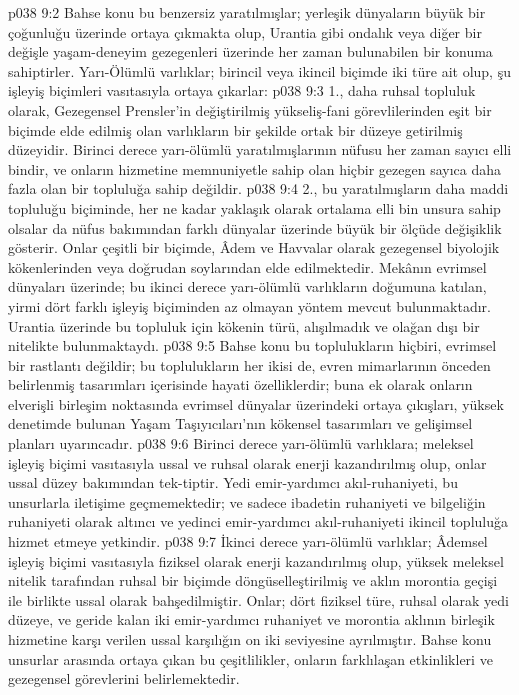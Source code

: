 \vs p038 9:2 Bahse konu bu benzersiz yaratılmışlar; yerleşik dünyaların büyük bir çoğunluğu üzerinde ortaya çıkmakta olup, Urantia gibi ondalık veya diğer bir değişle yaşam\hyp{}deneyim gezegenleri üzerinde her zaman bulunabilen bir konuma sahiptirler. Yarı\hyp{}Ölümlü varlıklar; birincil veya ikincil biçimde iki türe ait olup, şu işleyiş biçimleri vasıtasıyla ortaya çıkarlar:
\vs p038 9:3 1.\bibnobreakspace {}, daha ruhsal topluluk olarak, Gezegensel Prensler’in değiştirilmiş yükseliş\hyp{}fani görevlilerinden eşit bir biçimde elde edilmiş olan varlıkların bir şekilde ortak bir düzeye getirilmiş düzeyidir. Birinci derece yarı\hyp{}ölümlü yaratılmışlarının nüfusu her zaman sayıcı elli bindir, ve onların hizmetine memnuniyetle sahip olan hiçbir gezegen sayıca daha fazla olan bir topluluğa sahip değildir.
\vs p038 9:4 2.\bibnobreakspace {}, bu yaratılmışların daha maddi topluluğu biçiminde, her ne kadar yaklaşık olarak ortalama elli bin unsura sahip olsalar da nüfus bakımından farklı dünyalar üzerinde büyük bir ölçüde değişiklik gösterir. Onlar çeşitli bir biçimde, Âdem ve Havvalar olarak gezegensel biyolojik kökenlerinden veya doğrudan soylarından elde edilmektedir. Mekânın evrimsel dünyaları üzerinde; bu ikinci derece yarı\hyp{}ölümlü varlıkların doğumuna katılan, yirmi dört farklı işleyiş biçiminden az olmayan yöntem mevcut bulunmaktadır. Urantia üzerinde bu topluluk için kökenin türü, alışılmadık ve olağan dışı bir nitelikte bulunmaktaydı.
\vs p038 9:5 Bahse konu bu toplulukların hiçbiri, evrimsel bir rastlantı değildir; bu toplulukların her ikisi de, evren mimarlarının önceden belirlenmiş tasarımları içerisinde hayati özelliklerdir; buna ek olarak onların elverişli birleşim noktasında evrimsel dünyalar üzerindeki ortaya çıkışları, yüksek denetimde bulunan Yaşam Taşıyıcıları’nın kökensel tasarımları ve gelişimsel planları uyarıncadır.
\vs p038 9:6 Birinci derece yarı\hyp{}ölümlü varlıklara; meleksel işleyiş biçimi vasıtasıyla ussal ve ruhsal olarak enerji kazandırılmış olup, onlar ussal düzey bakımından tek\hyp{}tiptir. Yedi emir\hyp{}yardımcı akıl\hyp{}ruhaniyeti, bu unsurlarla iletişime geçmemektedir; ve sadece ibadetin ruhaniyeti ve bilgeliğin ruhaniyeti olarak altıncı ve yedinci emir\hyp{}yardımcı akıl\hyp{}ruhaniyeti ikincil topluluğa hizmet etmeye yetkindir.
\vs p038 9:7 İkinci derece yarı\hyp{}ölümlü varlıklar; Âdemsel işleyiş biçimi vasıtasıyla fiziksel olarak enerji kazandırılmış olup, yüksek meleksel nitelik tarafından ruhsal bir biçimde döngüselleştirilmiş ve aklın morontia geçişi ile birlikte ussal olarak bahşedilmiştir. Onlar; dört fiziksel türe, ruhsal olarak yedi düzeye, ve geride kalan iki emir\hyp{}yardımcı ruhaniyet ve morontia aklının birleşik hizmetine karşı verilen ussal karşılığın on iki seviyesine ayrılmıştır. Bahse konu unsurlar arasında ortaya çıkan bu çeşitlilikler, onların farklılaşan etkinlikleri ve gezegensel görevlerini belirlemektedir.
